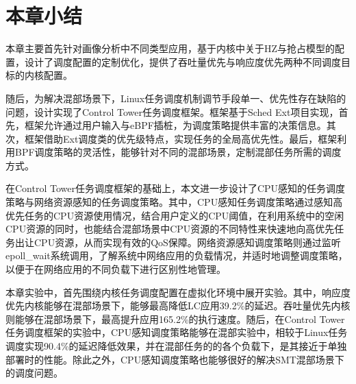 \section{本章小结}

本章主要首先针对画像分析中不同类型应用，基于内核中关于HZ与抢占模型的配置，设计了调度配置的定制优化，提供了吞吐量优先与响应度优先两种不同调度目标的内核配置。

随后，为解决混部场景下，Linux任务调度机制调节手段单一、优先性存在缺陷的问题，设计实现了Control Tower任务调度框架。框架基于Sched Ext项目实现，首先，框架允许通过用户输入与eBPF插桩，为调度策略提供丰富的决策信息。其次，框架借助Ext调度类的优先级特点，实现任务的全局高优先性。最后，框架利用BPF调度策略的灵活性，能够针对不同的混部场景，定制混部任务所需的调度方式。

在Control Tower任务调度框架的基础上，本文进一步设计了CPU感知的任务调度策略与网络资源感知的任务调度策略。其中，CPU感知任务调度策略通过感知高优先任务的CPU资源使用情况，结合用户定义的CPU阈值，在利用系统中的空闲CPU资源的同时，也能结合混部场景中CPU资源的不同特性来快速地向高优先任务出让CPU资源，从而实现有效的QoS保障。网络资源感知调度策略则通过监听epoll\_wait系统调用，了解系统中网络应用的负载情况，并适时地调整调度策略，以便于在网络应用的不同负载下进行区别性地管理。

本章实验中，首先围绕内核任务调度配置在虚拟化环境中展开实验。其中，响应度优先内核能够在混部场景下，能够最高降低LC应用39.2\%的延迟。吞吐量优先内核则能够在混部场景下，最高提升应用165.2\%的执行速度。随后，在Control Tower任务调度框架的实验中，CPU感知调度策略能够在混部实验中，相较于Linux任务调度实现90.4\%的延迟降低效果，并在混部任务的的各个负载下，是其接近于单独部署时的性能。除此之外，CPU感知调度策略也能够很好的解决SMT混部场景下的调度问题。